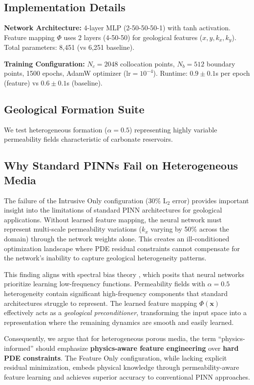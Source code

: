 \documentclass[sn-mathphys]{sn-jnl}
\begin{document}
	\subsection{Implementation Details}
	
	\textbf{Network Architecture:} 4-layer MLP (2-50-50-50-1) with tanh activation. Feature mapping $\Phi$ uses 2 layers (4-50-50) for geological features ($x, y, k_x, k_y$). Total parameters: 8,451 (vs 6,251 baseline).
	
	\textbf{Training Configuration:} $N_c=2048$ collocation points, $N_b=512$ boundary points, 1500 epochs, AdamW optimizer ($\text{lr}=10^{-4}$). Runtime: $0.9\pm0.1$s per epoch (feature) vs $0.6\pm0.1$s (baseline).
	
	\subsection{Geological Formation Suite}
	We test heterogeneous formation ($\alpha=0.5$) representing highly variable permeability fields characteristic of carbonate reservoirs.
	\subsection{Why Standard PINNs Fail on Heterogeneous Media}
	\label{sec:why_intrusive_fails}
	
	The failure of the Intrusive Only configuration (30\% L$_2$ error) provides 
	important insight into the limitations of standard PINN architectures for 
	geological applications. Without learned feature mapping, the neural network 
	must represent multi-scale permeability variations ($k_x$ varying by 50\% 
	across the domain) through the network weights alone. This creates an 
	ill-conditioned optimization landscape where PDE residual constraints 
	cannot compensate for the network's inability to capture geological 
	heterogeneity patterns.
	
	This finding aligns with spectral bias theory \citep{rahaman2019spectral}, 
	which posits that neural networks prioritize learning low-frequency functions. 
	Permeability fields with $\alpha=0.5$ heterogeneity contain significant 
	high-frequency components that standard architectures struggle to represent. 
	The learned feature mapping $\Phi(\mathbf{x})$ effectively acts as a 
	\emph{geological preconditioner}, transforming the input space into a 
	representation where the remaining dynamics are smooth and easily learned.
	
	Consequently, we argue that for heterogeneous porous media, the term 
	``physics-informed'' should emphasize \textbf{physics-aware feature engineering} 
	over \textbf{hard PDE constraints}. The Feature Only configuration, while 
	lacking explicit residual minimization, embeds physical knowledge through 
	permeability-aware feature learning and achieves superior accuracy to 
	conventional PINN approaches.
\end{document}
